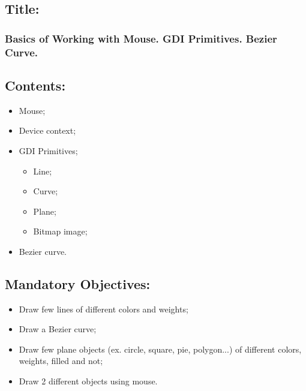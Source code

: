 \documentclass[12pt]{article}
\begin{document}
        \pagebreak
        \subsection*{Title:}
        \subsubsection*{Basics of Working with Mouse. GDI Primitives. Bezier Curve. }
        \subsection*{Contents:}
        \begin{itemize}
                \item Mouse;
                \item Device context;
                \item GDI Primitives;
                \begin{itemize}
                        \item Line;
                        \item Curve;
                        \item Plane;
                        \item Bitmap image;
                \end{itemize}
                \item Bezier curve.
        \end{itemize}
       
        \subsection*{Mandatory Objectives:}
        \begin{itemize}
                \item Draw few lines of different colors and weights;
                \item Draw a Bezier curve;
                \item Draw few plane objects (ex. circle, square, pie, polygon...) of different colors, weights, filled and not;
                \item Draw 2 different objects using mouse.
        \end{itemize}
\end{document}
